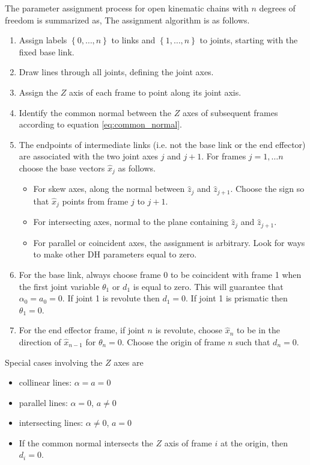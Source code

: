 \documentclass[11pt, onecolumn, oneside, reqno]{article}
\begin{document}
The parameter assignment process for open kinematic chains with $n$ degrees of freedom  is summarized as, The assignment algorithm is as follows.
\begin{enumerate}
\item Assign labels $\left\lbrace 0, \ldots , n\right\rbrace$ to links and $\left\lbrace 1, \ldots , n\right\rbrace$ to joints, starting with the fixed base link.
\item Draw lines through all joints, defining the joint axes.
\item Assign the $Z$ axis of each frame to point along its joint axis.
\item Identify the common normal between the $Z$ axes of subsequent frames according to equation \ref{eq:common_normal}.
\item The endpoints of intermediate links (i.e. not the base link or the end effector) are associated with the two joint axes $j$ and $j+1$. For frames $j = 1, \ldots n$ choose the base vectors $\hat{x}_j$ as follows.
\begin{itemize}
\item For skew axes, along the normal between $\hat{z}_j$ and $\hat{z}_{j+1}$. Choose the sign so that $\hat{x}_j$ points from frame $j$ to $j+1$.
\item For intersecting axes, normal to the plane containing $\hat{z}_j$ and $\hat{z}_{j+1}$.
\item For parallel or coincident axes, the assignment is arbitrary. Look for ways to make other DH parameters equal to zero.
\end{itemize}
\item For the base link, always choose frame 0 to be coincident with frame 1 when the first joint variable $\theta_1$ or $d_1$ is equal to zero. This will guarantee that $\alpha_0 = a_0 = 0$. If joint 1 is revolute then $d_1 = 0$. If joint 1 is prismatic then $\theta_1 = 0$.
\item For the end effector frame, if joint $n$ is revolute, choose $\hat{x}_n$ to be in the direction of $\hat{x}_{n-1}$ for $\theta_n = 0$. Choose the origin of frame $n$ such that $d_n = 0$.
\end{enumerate}

Special cases involving the $Z$ axes are
\begin{itemize}
\item collinear lines: $\alpha = a = 0$
\item parallel lines: $\alpha = 0$, $a \neq 0$
\item intersecting lines: $\alpha \neq 0$, $a = 0$
\item If the common normal intersects the $Z$ axis of frame $i$ at the origin, then $d_i = 0$.
\end{itemize}
\end{document}
